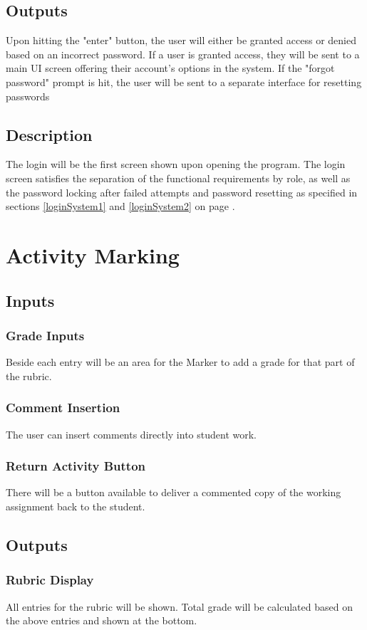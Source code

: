 \documentclass{article}
\begin{document}
\subsection{Outputs}
Upon hitting the "enter" button, the user will either be granted access or denied based
on an incorrect password. If a user is granted access, they will be sent
to a main UI screen offering their account's options in the system.
If the "forgot password" prompt is hit, the user will be sent to a separate
interface for resetting passwords
\subsection{Description}
The login will be the first screen shown upon opening the program. The login screen 
satisfies the separation of the functional requirements by role, as well as the
password locking after failed attempts and password resetting as specified in
sections \ref{loginSystem1} and \ref{loginSystem2} on page \pageref{loginSystem1}.

\section{Activity Marking}
\subsection{Inputs}
\subsubsection{Grade Inputs}
Beside each entry will be an
area for the Marker to add a grade for that part of the rubric.
\subsubsection{Comment Insertion}
The user can insert comments directly into student work.
\subsubsection{Return Activity Button}
There will be a button available to deliver a commented copy of the working
assignment back to the student.
\subsection{Outputs}
\subsubsection{Rubric Display}
All entries for the rubric will be shown.
Total grade will be calculated based on the above entries and shown at the
bottom.
\end{document}
